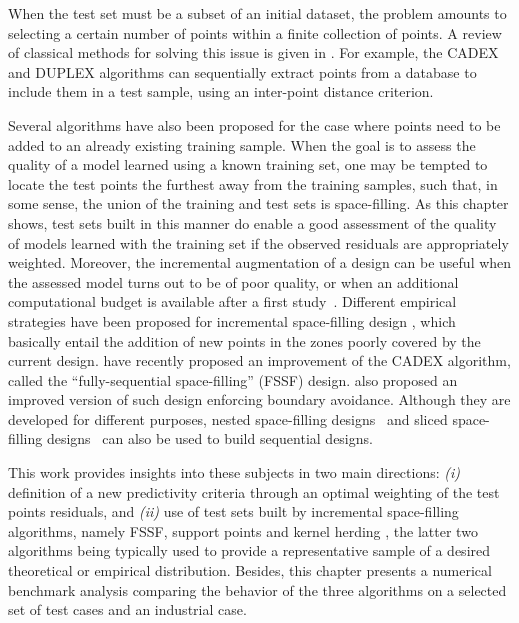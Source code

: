 When the test set must be a subset of an initial dataset, the problem amounts to selecting a certain number of points within a finite collection of points. 
A review of classical methods for solving this issue is given in \citet{borjir12}. 
For example, the CADEX and DUPLEX algorithms \citep{kensto69,sne77} can sequentially extract points from a database to include them in a test sample, using an inter-point distance criterion. 

Several algorithms have also been proposed for the case where points need to be added to an already existing training sample. 
When the goal is to assess the quality of a model learned using a known training set, one may be tempted to locate the test points the furthest away from the training samples, such that, in some sense, the union of the training and test sets is space-filling. 
As this chapter shows, test sets built in this manner do enable a good assessment of the quality of models learned with the training set if the observed residuals are appropriately weighted. 
Moreover, the incremental augmentation of a design can be useful when the assessed model turns out to be of poor quality, or when an additional computational budget is available after a first study~\citep{sheraz17,shang_apley_2020}. 
Different empirical strategies have been proposed for incremental space-filling design \citep{ioobou10,crolae11,lilu17}, which basically entail the addition of new points in the zones poorly covered by the current design. 
\citet{shang_apley_2020} have recently proposed an improvement of the CADEX algorithm, called the ``fully-sequential space-filling'' (FSSF) design. 
\citet{NogalesPR2021} also proposed an improved version of such design enforcing boundary avoidance. 
Although they are developed for different purposes, nested space-filling designs~\citep{qiaai09} and sliced space-filling designs~\citep{qiawu09} can also be used to build sequential designs. 

This work provides insights into these subjects in two main directions: \textit{(i)} definition of a new predictivity criteria through an optimal weighting of the test points residuals, and \textit{(ii)} use of test sets built by incremental space-filling algorithms, namely FSSF, support points \cite{mak_joseph_2018} and kernel herding \cite{chen_welling_2010}, the latter two algorithms being typically used to provide a representative sample of a desired theoretical or empirical distribution. 
Besides, this chapter presents a numerical benchmark analysis comparing the behavior of the three algorithms on a selected set of test cases and an industrial case.

